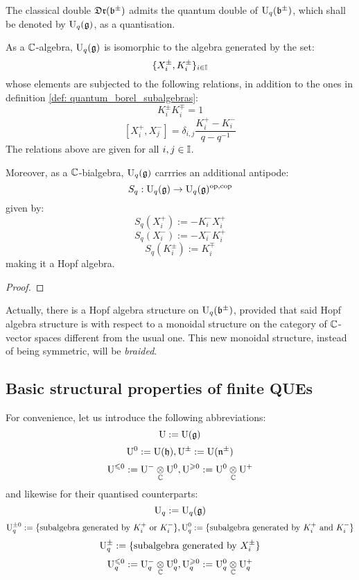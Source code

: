         \begin{theorem}
            The classical double $\mathfrak{Dr}(\mathfrak{b}^{\pm})$ admits the quantum double of $\mathrm{U}_q(\mathfrak{b}^{\pm})$, which shall be denoted by $\mathrm{U}_q(\mathfrak{g})$, as a quantisation.

            As a $\mathbb{C}$-algebra, $\mathrm{U}_q(\mathfrak{g})$ is isomorphic to the algebra generated by the set:
                $$\{X_i^{\pm}, K_i^{\pm}\}_{i \in \mathbb{I}}$$
            whose elements are subjected to the following relations, in addition to the ones in definition \ref{def: quantum_borel_subalgebras}:
                $$K_i^{\pm} K_i^{\mp} = 1$$
                $$[X_i^+, X_j^-] = \delta_{i, j} \frac{K_i^+ - K_i^-}{q - q^{-1}}$$
            The relations above are given for all $i, j \in \mathbb{I}$.

            Moreover, as a $\mathbb{C}$-bialgebra, $\mathrm{U}_q(\mathfrak{g})$ carrries an additional antipode:
                $$S_q: \mathrm{U}_q(\mathfrak{g}) \to \mathrm{U}_q(\mathfrak{g})^{\mathrm{op}, \mathrm{cop}}$$
            given by:
                $$S_q(X_i^+) := -K_i^- X_i^+$$
                $$S_q(X_i^-) := -X_i^- K_i^+$$
                $$S_q(K_i^{\pm}) := K_i^{\mp}$$
            making it a Hopf algebra. 
        \end{theorem}
            \begin{proof}
                
            \end{proof}

        Actually, there is a Hopf algebra structure on $\mathrm{U}_q(\mathfrak{b}^{\pm})$, provided that said Hopf algebra structure is with respect to a monoidal structure on the category of $\mathbb{C}$-vector spaces different from the usual one. This new monoidal structure, instead of being symmetric, will be \textit{braided}.

     \subsection{Basic structural properties of finite QUEs}
        For convenience, let us introduce the following abbreviations:
            $$\mathrm{U} := \mathrm{U}(\mathfrak{g})$$
            $$\mathrm{U}^0 := \mathrm{U}(\mathfrak{h}), \mathrm{U}^{\pm} := \mathrm{U}(\mathfrak{n}^{\pm})$$
            $$\rmU^{\leq 0} := \rmU^- \tensor_{\bbC} \rmU^0, \rmU^{\geq 0} := \rmU^0 \tensor_{\bbC} \rmU^+$$
        and likewise for their quantised counterparts:
            $$\mathrm{U}_q := \mathrm{U}_q(\mathfrak{g})$$
            $$\mathrm{U}_q^{\pm 0} := \{ \text{subalgebra generated by $K_i^+$ or $K_i^-$} \}, \mathrm{U}_q^0 := \{ \text{subalgebra generated by $K_i^+$ and $K_i^-$} \}$$
            $$\mathrm{U}_q^{\pm} := \{ \text{subalgebra generated by $X_i^{\pm}$} \}$$
            $$\rmU_q^{\leq 0} := \rmU_q^- \tensor_{\bbC} \rmU_q^0, \rmU_q^{\geq 0} := \rmU_q^0 \tensor_{\bbC} \rmU_q^+$$